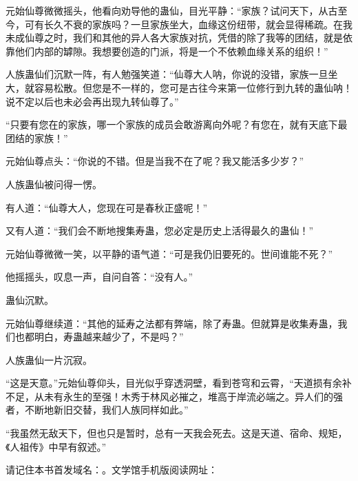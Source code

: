 \begin{this_body}
元始仙尊微微摇头，他看向劝导他的蛊仙，目光平静：“家族？试问天下，从古至今，可有长久不衰的家族吗？一旦家族坐大，血缘这份纽带，就会显得稀疏。在我未成仙尊之时，我们和其他的异人各大家族对抗，凭借的除了我等的团结，就是依靠他们内部的罅隙。我想要创造的门派，将是一个不依赖血缘关系的组织！”

人族蛊仙们沉默一阵，有人勉强笑道：“仙尊大人呐，你说的没错，家族一旦坐大，就容易松散。但您是不一样的，您可是古往今来第一位修行到九转的蛊仙呐！说不定以后也未必会再出现九转仙尊了。”

“只要有您在的家族，哪一个家族的成员会敢游离向外呢？有您在，就有天底下最团结的家族！”

元始仙尊点头：“你说的不错。但是当我不在了呢？我又能活多少岁？”

人族蛊仙被问得一愣。

有人道：“仙尊大人，您现在可是春秋正盛呢！”

又有人道：“我们会不断地搜集寿蛊，您必定是历史上活得最久的蛊仙！”

元始仙尊微微一笑，以平静的语气道：“可是我仍旧要死的。世间谁能不死？”

他摇摇头，叹息一声，自问自答：“没有人。”

蛊仙沉默。

元始仙尊继续道：“其他的延寿之法都有弊端，除了寿蛊。但就算是收集寿蛊，我们也都明白，寿蛊越来越少了，不是吗？”

人族蛊仙一片沉寂。

“这是天意。”元始仙尊仰头，目光似乎穿透洞壁，看到苍穹和云霄，“天道损有余补不足，从未有永生的至强！木秀于林风必摧之，堆高于岸流必端之。异人们的强者，不断地新旧交替，我们人族同样如此。”

“我虽然无敌天下，但也只是暂时，总有一天我会死去。这是天道、宿命、规矩，《人祖传》中早有叙述。”

请记住本书首发域名：。文学馆手机版阅读网址：

\end{this_body}

